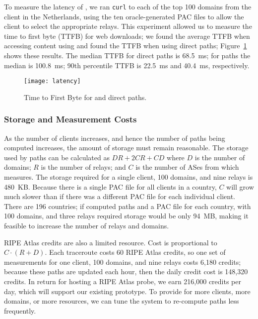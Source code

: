 To measure the latency of \system{}, we ran {\tt curl} to each of the  top 100
domains from the client in the Netherlands, using the ten oracle-generated PAC
files to allow the client to select the appropriate relays. This experiment
allowed us to measure the time to first byte (TTFB) for web downloads; we
found the average TTFB when accessing content using \system{} and  found the
TTFB when using direct paths; 
Figure~\ref{fig:latency} shows these results. The median TTFB for direct paths is
68.5~ms; for
\system{} paths the median is 100.8~ms; 90th percentile TTFB is 22.5~ms and
40.4~ms, respectively.


\begin{figure}[t]
\centering
\texttt{[image: latency]}
\caption{Time to First Byte for \system{} and direct paths.}
\label{fig:latency}
\end{figure}


\subsubsection{Storage and Measurement Costs}

As the number of clients increases, and hence the number of paths being 
computed increases, the amount of storage must remain reasonable.  The storage 
used by paths can be calculated as
$DR + 2CR + CD$
where $D$ is the number of domains; $R$ is the number of relays; and $C$ is the
number of ASes from which \system{} measures.
The storage required for a single client, 100 domains, and nine relays is
480~KB.  Because there is a single PAC file for all clients in 
a country, $C$ will grow much slower than if there was a different PAC file for 
each individual client.  There are 196 countries; if \system{} computed
paths and a PAC file for each country, with 100 domains, and 
three relays required storage would be only 94~MB, making it
feasible to increase the number of relays and domains.

RIPE Atlas credits are also a limited resource.  Cost is proportional to
$C \cdot (R+D)$.
Each traceroute costs 60 RIPE Atlas credits, so one set of measurements
for one client, 100 domains, and nine relays costs 6,180 
credits; because these paths are updated each hour, then 
the daily credit cost is 148,320 credits.  In return for hosting a RIPE Atlas 
probe, we earn 216,000 credits per day, which will support our existing 
prototype.  To provide for more clients, more domains, or more 
resources, we can tune the system to re-compute paths less frequently.%
